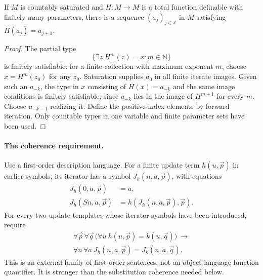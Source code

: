 \begin{lemma}
\label{lem:biinfinite-orbit}
If $M$ is countably saturated and $H:M\to M$ is a total function
definable with finitely many parameters, there is a sequence
$(a_j)_{j\in\mathbb Z}$ in $M$ satisfying $H(a_j)=a_{j+1}$.
\end{lemma}
\begin{proof}
The partial type
\[
 \{\exists z\ H^m(z)=x:m\in\mathbb N\}
\]
is finitely satisfiable: for a finite collection with maximum exponent
$m$, choose $x=H^m(z_0)$ for any $z_0$.  Saturation supplies $a_0$ in
all finite iterate images.  Given such an $a_{-k}$, the type in $x$
consisting of $H(x)=a_{-k}$ and the same image conditions is finitely
satisfiable, since $a_{-k}$ lies in the image of $H^{m+1}$ for every
$m$.  Choose $a_{-k-1}$ realizing it.  Define the positive-index
elements by forward iteration.  Only countable types in one variable
and finite parameter sets have been used.
\end{proof}

\paragraph{The coherence requirement.}
Use a first-order description language.  For a finite update term
$h(u,\vec p)$ in earlier symbols, its iterator has a symbol
$J_h(n,a,\vec p)$, with equations
\begin{align}
 J_h(0,a,\vec p)&=a,\label{eq:independence-zero}\\
 J_h(Sn,a,\vec p)&=h(J_h(n,a,\vec p),\vec p).
 \label{eq:independence-step}
\end{align}
For every two update templates whose iterator symbols have been
introduced, require
\begin{multline}
 \forall\vec p\,\forall\vec q\,
 \bigl(\forall u\ h(u,\vec p)=k(u,\vec q)\bigr)\ \longrightarrow\\
 \forall n\,\forall a\ J_h(n,a,\vec p)=J_k(n,a,\vec q).
 \label{eq:independence-coherence}
\end{multline}
This is an external family of first-order sentences, not an
object-language function quantifier.  It is stronger than the
substitution coherence needed below.

